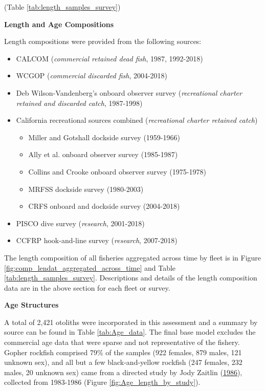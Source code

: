 \documentclass[12pt,]{article}
\begin{document}
(Table \ref{tab:length_samples_survey})

\textbf{Length and Age Compositions}

Length compositions were provided from the following sources:

\begin{itemize}[noitemsep,nolistsep,topsep=0pt]
  \item CALCOM (\emph{commercial retained dead fish}, 1987, 1992-2018)   
  \item WCGOP (\emph{commercial discarded fish}, 2004-2018)    
  \item Deb Wilson-Vandenberg's onboard observer survey (\emph{recreational charter retained and discarded catch}, 1987-1998)
  \item California recreational sources combined (\emph{recreational charter retained catch})     
    \begin{itemize}[noitemsep,nolistsep]
      \item Miller and Gotshall dockside survey (1959-1966)    
      \item Ally  et al. onboard observer survey (1985-1987)
      \item Collins and Crooke onboard observer survey (1975-1978)     
      \item MRFSS dockside survey (1980-2003)     
      \item CRFS onboard and dockside survey (2004-2018)
    \end{itemize}
 \item PISCO dive survey (\emph{research}, 2001-2018)      
 \item CCFRP hook-and-line survey (\emph{research}, 2007-2018)        
\end{itemize}

The length composition of all fisheries aggregated across time by fleet
is in Figure \ref{fig:comp_lendat_aggregated_across_time} and Table
\ref{tab:length_samples_survey}. Descriptions and details of the length
composition data are in the above section for each fleet or survey.

\vspace{.5cm} \textbf{Age Structures}

A total of 2,421 otoliths were incorporated in this assessment and a
summary by source can be found in Table \ref{tab:Age_data}. The final
base model excludes the commercial age data that were sparse and not
representative of the fishery. Gopher rockfish comprised 79\% of the
samples (922 females, 879 males, 121 unknown sex), and all but a few
black-and-yellow rockfish (247 females, 232 males, 20 unknown sex) came
from a directed study by Jody Zaitlin
(\protect\hyperlink{ref-Zaitlin1986}{1986}), collected from 1983-1986
(Figure \ref{fig:Age_length_by_study}).
\end{document}
